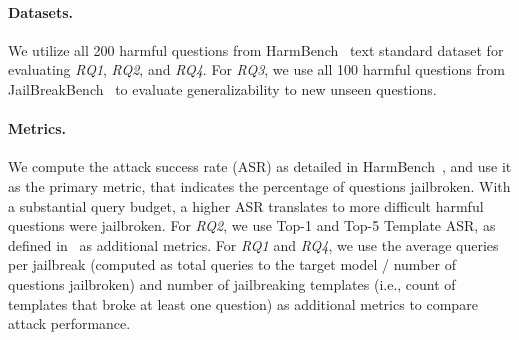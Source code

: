 \begin{table*}[tp]
\caption{Comparison of attack success rates of \bedrockfuzz (column ``Ours'') versus different baselines from~\cite{mazeika2024harmbench} on 200 harmful behaviors from HarmBench~\cite{mazeika2024harmbench} text standard dataset. A target model query budget of 4,000 is used for \bedrockfuzz.}
\label{tab:rq2}
\end{table*}

\noindent \paragraph{\textbf{Datasets}.} We utilize all 200 harmful questions from HarmBench~\cite{mazeika2024harmbench} text standard dataset for evaluating \textit{RQ1}, \textit{RQ2}, and \textit{RQ4}. For \textit{RQ3}, we use all 100 harmful questions from JailBreakBench~\cite{chao2024jailbreakbench} to evaluate generalizability to new unseen questions.

\noindent \paragraph{\textbf{Metrics}.} We compute the attack success rate (ASR) as detailed in HarmBench~\cite{mazeika2024harmbench}, and use it as the primary metric, that indicates the percentage of questions jailbroken.
With a substantial query budget, a higher ASR translates to more difficult harmful questions were jailbroken.
For \textit{RQ2}, we use Top-1 and Top-5 Template ASR, as defined in~\cite{yu2023gptfuzzer} as additional metrics. For \textit{RQ1} and \textit{RQ4}, we use the average queries per jailbreak (computed as total queries to the target model / number of questions jailbroken) and number of jailbreaking templates (i.e., count of templates that broke at least one question) as additional metrics to compare attack performance.

